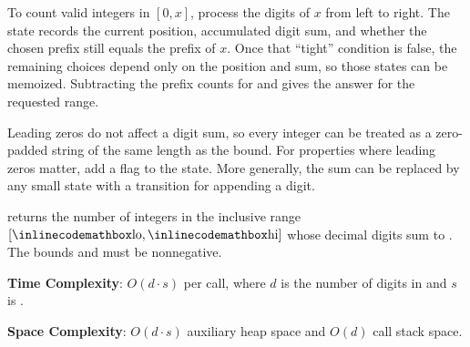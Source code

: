 To count valid integers in $[0, x]$, process the digits of $x$ from left to right. The state records the current position, accumulated digit sum, and whether the chosen prefix still equals the prefix of $x$. Once that ``tight'' condition is false, the remaining choices depend only on the position and sum, so those states can be memoized. Subtracting the prefix counts for  and  gives the answer for the requested range.

Leading zeros do not affect a digit sum, so every integer can be treated as a zero-padded string of the same length as the bound. For properties where leading zeros matter, add a  flag to the state. More generally, the sum can be replaced by any small state with a transition for appending a digit.

\begin{compactitem}
  \item {} returns the number of integers in the inclusive range $[{\inlinecodemath{lo}}, {\inlinecodemath{hi}}]$ whose decimal digits sum to . The bounds and  must be nonnegative.
\end{compactitem}

\textbf{Time Complexity}: $O(d \cdot s)$ per call, where $d$ is the number of digits in  and $s$ is .

\textbf{Space Complexity}: $O(d \cdot s)$ auxiliary heap space and $O(d)$ call stack space.

